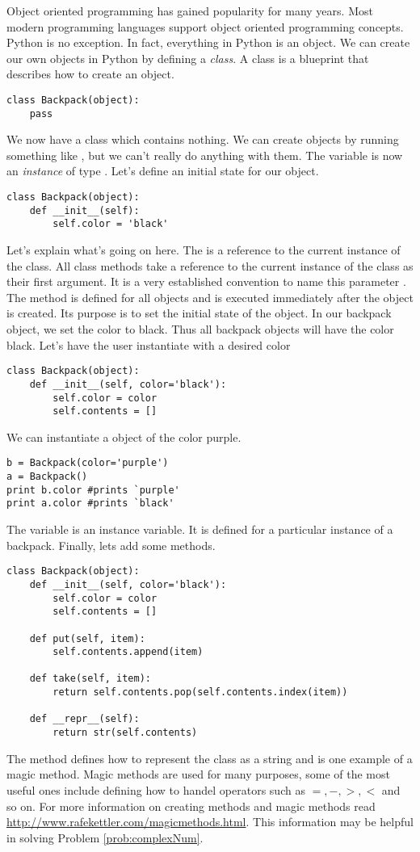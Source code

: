 Object oriented programming has gained popularity for many years.
Most modern programming languages support object oriented programming concepts.
Python is no exception.
In fact, everything in Python is an object.
We can create our own objects in Python by defining a \emph{class}.
A class is a blueprint that describes how to create an object.
\begin{lstlisting}
class Backpack(object):
    pass
\end{lstlisting}
We now have a class  which contains nothing.
We can create  objects by running something like , but we can't really do anything with them.
The variable  is now an \emph{instance} of type .
Let's define an initial state for our object.
\begin{lstlisting}
class Backpack(object):
    def __init__(self):
        self.color = 'black'
\end{lstlisting}
Let's explain what's going on here.
The  is a reference to the current instance of the class.
All class methods take a reference to the current instance of the class as their first argument.
It is a very established convention to name this parameter .
The  method is defined for all objects and is executed immediately after the object is created.
Its purpose is to set the initial state of the object.
In our backpack object, we set the color to black.
Thus all backpack objects will have the color black.
Let's have the user instantiate with a desired color
\begin{lstlisting}
class Backpack(object):
    def __init__(self, color='black'):
        self.color = color
        self.contents = []
\end{lstlisting}
We can instantiate a  object of the color purple.
\begin{lstlisting}
b = Backpack(color='purple')
a = Backpack()
print b.color #prints `purple'
print a.color #prints `black'
\end{lstlisting}
The variable  is an instance variable.
It is defined for a particular instance of a backpack.
Finally, lets add some methods.
\begin{lstlisting}
class Backpack(object):
    def __init__(self, color='black'):
        self.color = color
        self.contents = []
        
    def put(self, item):
        self.contents.append(item)
        
    def take(self, item):
        return self.contents.pop(self.contents.index(item))
        
    def __repr__(self):
        return str(self.contents)
\end{lstlisting}
The  method defines how to represent the class as a string and is one example of a magic method.
Magic methods are used for many purposes, some of the most useful ones include defining how to handel operators such as $ =, - , >, <$ and so on.
For more information on creating methods and magic methods read \url{http://www.rafekettler.com/magicmethods.html}.
This information may be helpful in solving Problem \ref{prob:complexNum}.

